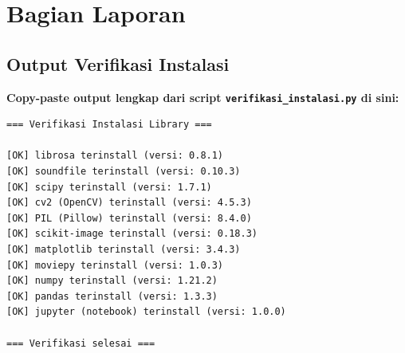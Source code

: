 \documentclass[11pt,a4paper]{article}
\begin{document}
\section{Bagian Laporan}

\subsection{Output Verifikasi Instalasi}
\textbf{Copy-paste output lengkap dari script \texttt{verifikasi\_instalasi.py} di sini:}

\begin{lstlisting}[caption=Output verifikasi instalasi]
=== Verifikasi Instalasi Library ===

[OK] librosa terinstall (versi: 0.8.1)
[OK] soundfile terinstall (versi: 0.10.3)
[OK] scipy terinstall (versi: 1.7.1)
[OK] cv2 (OpenCV) terinstall (versi: 4.5.3)
[OK] PIL (Pillow) terinstall (versi: 8.4.0)
[OK] scikit-image terinstall (versi: 0.18.3)
[OK] matplotlib terinstall (versi: 3.4.3)
[OK] moviepy terinstall (versi: 1.0.3)
[OK] numpy terinstall (versi: 1.21.2)
[OK] pandas terinstall (versi: 1.3.3)
[OK] jupyter (notebook) terinstall (versi: 1.0.0)

=== Verifikasi selesai ===
\end{lstlisting}
\end{document}
